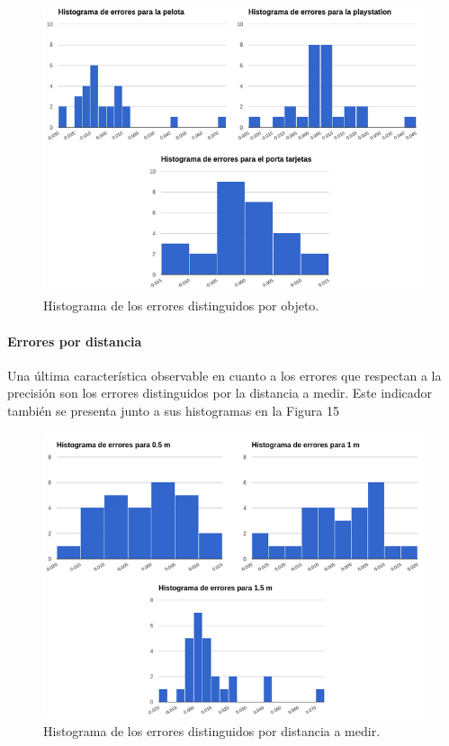 \documentclass[11pt,a4paper,titlepage]{article}
\newcommand{\Figure}[1]{Figura #1}
\begin{document}
\begin{figure}[h!]

  \centering
    \includegraphics[width=1\textwidth]{f13.png}
  \caption{Histograma de los errores distinguidos por objeto.}
\end{figure}

\paragraph{Errores por distancia}
\hfill \break

Una última característica observable en cuanto a los errores que respectan a la precisión son los errores distinguidos por la distancia a medir. Este indicador también se presenta junto a sus histogramas en la \Figure{15}


\begin{figure}[h!]

  \centering
    \includegraphics[width=1\textwidth]{f14.png}
  \caption{Histograma de los errores distinguidos por distancia a medir.}
\end{figure}
\end{document}
